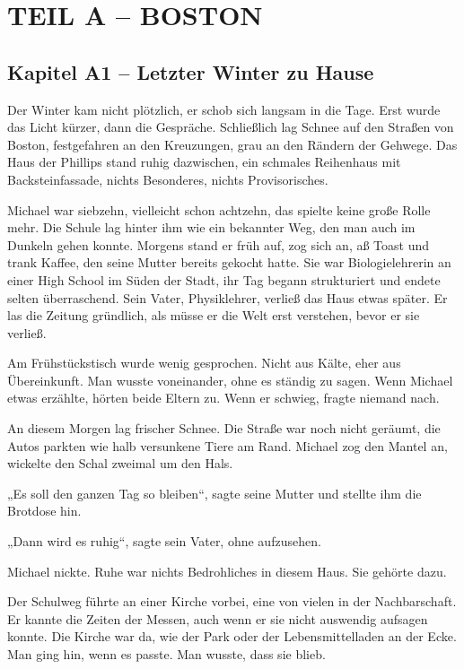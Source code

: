 \documentclass[
]{article}
\begin{document}
\section{TEIL A -- BOSTON}\label{teil-a-boston}

\subsection{Kapitel A1 -- Letzter Winter zu Hause}\label{kapitel-a1-letzter-winter-zu-hause}

Der Winter kam nicht plötzlich, er schob sich langsam in die Tage. Erst wurde das Licht kürzer, dann die Gespräche. Schließlich lag Schnee auf den Straßen von Boston, festgefahren an den Kreuzungen, grau an den Rändern der Gehwege. Das Haus der Phillips stand ruhig dazwischen, ein schmales Reihenhaus mit Backsteinfassade, nichts Besonderes, nichts Provisorisches.

Michael war siebzehn, vielleicht schon achtzehn, das spielte keine große Rolle mehr. Die Schule lag hinter ihm wie ein bekannter Weg, den man auch im Dunkeln gehen konnte. Morgens stand er früh auf, zog sich an, aß Toast und trank Kaffee, den seine Mutter bereits gekocht hatte. Sie war Biologielehrerin an einer High School im Süden der Stadt, ihr Tag begann strukturiert und endete selten überraschend. Sein Vater, Physiklehrer, verließ das Haus etwas später. Er las die Zeitung gründlich, als müsse er die Welt erst verstehen, bevor er sie verließ.

Am Frühstückstisch wurde wenig gesprochen. Nicht aus Kälte, eher aus Übereinkunft. Man wusste voneinander, ohne es ständig zu sagen. Wenn Michael etwas erzählte, hörten beide Eltern zu. Wenn er schwieg, fragte niemand nach.

An diesem Morgen lag frischer Schnee. Die Straße war noch nicht geräumt, die Autos parkten wie halb versunkene Tiere am Rand. Michael zog den Mantel an, wickelte den Schal zweimal um den Hals.

„Es soll den ganzen Tag so bleiben``, sagte seine Mutter und stellte ihm die Brotdose hin.

„Dann wird es ruhig``, sagte sein Vater, ohne aufzusehen.

Michael nickte. Ruhe war nichts Bedrohliches in diesem Haus. Sie gehörte dazu.

Der Schulweg führte an einer Kirche vorbei, eine von vielen in der Nachbarschaft. Er kannte die Zeiten der Messen, auch wenn er sie nicht auswendig aufsagen konnte. Die Kirche war da, wie der Park oder der Lebensmittelladen an der Ecke. Man ging hin, wenn es passte. Man wusste, dass sie blieb.
\end{document}
